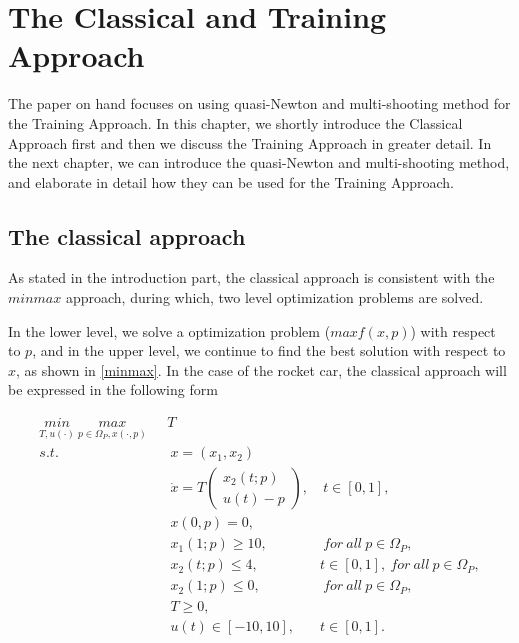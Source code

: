 

\chapter{The Classical and Training Approach}

The paper on hand focuses on using quasi-Newton and multi-shooting method for the Training Approach. In this chapter, we shortly introduce the Classical Approach first and then we discuss the Training Approach in greater detail. In the next chapter, we can introduce the quasi-Newton and multi-shooting method, and elaborate in detail how they can be used for the Training Approach. 



\section{The classical approach}

As stated in the introduction part, the classical approach is consistent with the $minmax$ approach, during which, two level optimization problems are solved. 

In the lower level, we solve a optimization problem ($max f(x,p)$) with respect to $p$, and in the upper level, we continue to find the best solution with respect to $x$, as shown in \ref{minmax}. In the case of the rocket car, the classical approach will be expressed in the following form


\begin{subequations}
	\begin{align}
		\underset{T, u(\cdot)}{min} \  \underset{ p \in \Omega_P, x(\cdot,p)}{max}  \ \   & \  T \\ 
		s.t.  & \ \ x = (x_1, x_2)   \label{ca_rc_x} \\ 
		& \ \  \dot{x} = T  \begin{pmatrix}  x_2(t;p) \\ u(t)-p   \end{pmatrix}, & \ t \in [0,1],  \label{ca_rc_partial} \\
		& \ \ x(0,p) = 0, \label{ca_rc_t0}\\
		& \ \ x_1(1;p) \geq 10, & \ for \ all \ p \in \Omega_P, \label{ca_rc_x1_t1} \\
		& \ \ x_2(t;p) \leq 4, & t \in [0,1], \ for \ all \ p \in \Omega_P,  \label{ca_rc_x2_tc} \\
		& \ \ x_2(1;p) \leq 0, & \ for \ all \ p \in \Omega_P, \label{ca_rc_x2_t1}  \\
		& \ \ T \geq 0, \\
		& \ \ u(t) \in [-10, 10], & t \in [0,1]. 
	\end{align}
	\label{ca_rc}
\end{subequations}












